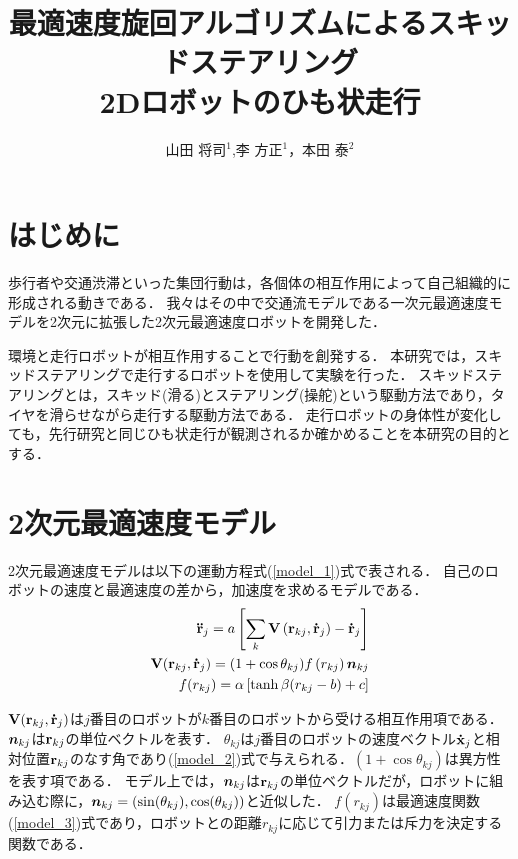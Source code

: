 \documentclass[twocolumn,dvipdfmx]{jarticle}
\title{%
最適速度旋回アルゴリズムによるスキッドステアリング\\
2Dロボットのひも状走行
}
\author{%
山田 将司$^1$,李 方正$^1$，本田 泰$^2$
}
\affiliation{%
$^1$ 室蘭工業大学大学院 工学研究科 情報電子工学系専攻\\
$^2$ 室蘭工業大学大学院　しくみ解明系領域
}
\begin{document}
\maketitle
\section{はじめに}
\vspace{-2mm}
歩行者や交通渋滞といった集団行動は，各個体の相互作用によって自己組織的に形成される動きである．
我々はその中で交通流モデルである一次元最適速度モデルを2次元に拡張した2次元最適速度ロボットを開発した\cite{mygm}．

環境と走行ロボットが相互作用することで行動を創発する．
本研究では，スキッドステアリングで走行するロボットを使用して実験を行った．
スキッドステアリングとは，スキッド(滑る)とステアリング(操舵)という駆動方法であり，タイヤを滑らせながら走行する駆動方法である．
走行ロボットの身体性が変化しても，先行研究\cite{mygm}と同じひも状走行が観測されるか確かめることを本研究の目的とする．

\vspace{-4mm}
\section{2次元最適速度モデル}
2次元最適速度モデルは以下の運動方程式(\ref{model_1})式で表される\cite{ov2}．
自己のロボットの速度と最適速度の差から，加速度を求めるモデルである．
\begin{eqnarray}
\label{model_1}
{\bf \ddot{r}}_{j} = a\left[ \sum_{k} {\bf V} \left({\bf r}_{kj},{\bf \dot{r}}_{j}\right) - {\bf \dot{r}}_{j} \right] \\
\label{model_2}
{\bf V}({\bf {r}}_{kj} , {\bf \dot{r}}_j) = (1+\cos\theta_{kj}) f\left(r_{kj}\right)  \mbox{\boldmath $n$}_{kj} \\
f(r_{kj}) = \alpha  \left[ \tanh\beta(r_{kj} - b ) + c \right]
\label{model_3}
\vspace{-2mm}
\end{eqnarray}

$ {\bf V}({\bf r}_{kj},{\bf \dot{r}}_{j}) $は$j$番目のロボットが$k$番目のロボットから受ける相互作用項である．
$\mbox{\boldmath $n$}_{kj}$は${\bf r}_{kj}$の単位ベクトルを表す．
$\theta_{kj}$は$j$番目のロボットの速度ベクトル${\bf \dot{x}}_j$と相対位置${\bf r}_{kj}$のなす角であり(\ref{model_2})式で与えられる．$(1+\cos\theta_{kj})$は異方性を表す項である．
モデル上では，$\mbox{\boldmath $n$}_{kj}$は${\bf r}_{kj}$の単位ベクトルだが，ロボットに組み込む際に，$\mbox{\boldmath $n$}_{kj} = (\sin(\theta_{kj}),\cos(\theta_{kj}))$と近似した．
$f(r_{kj})$は最適速度関数(\ref{model_3})式であり，ロボットとの距離$r_{kj}$に応じて引力または斥力を決定する関数である．
\end{document}
